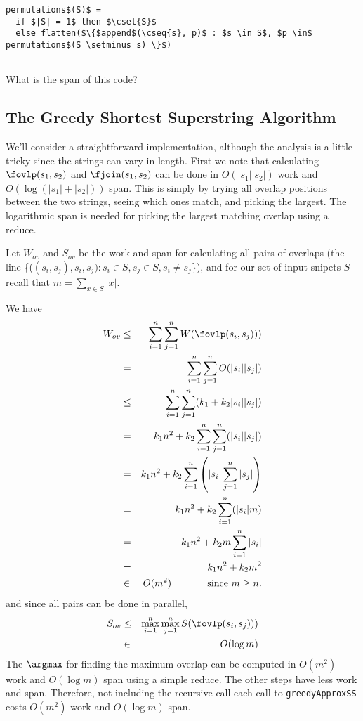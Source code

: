 \begin{lstlisting}[numbers=none]
permutations$(S)$ =
  if $|S| = 1$ then $\cset{S}$
  else flatten($\{$append$(\cseq{s}, p)$ : $s \in S$, $p \in$ permutations$(S \setminus s) \}$)
             
\end{lstlisting}

What is the span of this code?


\subsection{The Greedy Shortest Superstring Algorithm}

We'll consider a straightforward implementation, although the analysis
is a little tricky since the strings can vary in length.  First we
note that calculating $\fovlp(s_1,s_2)$ and $\fjoin(s_1,s_2)$ can be
done in $O(|s_1| |s_2|)$ work and $O(\log (|s_1|+|s_2|))$ span.  This
is simply by trying all overlap positions between the two strings,
seeing which ones match, and picking the largest.  The logarithmic
span is needed for picking the largest matching overlap using a
reduce.

Let $W_{ov}$ and $S_{ov}$ be the work and span for calculating
all pairs of overlaps (the line
\{(\fovlp\!\!$(s_i, s_j), s_i, s_j) : s_i \in S, s_j \in S, s_i \neq s_j$\}),
and for our set of input snipets $S$ recall that $m =  \sum_{x \in S} |x|$.

We have
\begin{eqnarray*}
W_{ov} & \leq & \sum_{i=1}^{n}\sum_{j=1}^{n} W(\fovlp(s_i,s_j)))\\
  & = & \sum_{i=1}^{n}\sum_{j=1}^{n} O(|s_i| |s_j|)\\
  & \leq & \sum_{i=1}^{n}\sum_{j=1}^{n} (k_1 + k_2 |s_i| |s_j|)\\
  & =    & k_1 n^2 + k_2 \sum_{i=1}^{n}\sum_{j=1}^{n} (|s_i| |s_j|)\\
  & =    & k_1 n^2 + k_2 \sum_{i=1}^{n} \left(|s_i| \sum_{j=1}^{n} |s_j|\right)\\
  & =    & k_1 n^2 + k_2 \sum_{i=1}^{n} (|s_i| m) \\
  & =    & k_1 n^2 + k_2 m \sum_{i=1}^{n} |s_i| \\
  & =    & k_1 n^2 + k_2 m^2\\
  & \in  & O(m^2)  \mbox{~~~~~~~~~~~since } m \geq n.
\end{eqnarray*}
and since all pairs can be done in parallel,
\begin{eqnarray*}
S_{ov} & \leq & \max_{i=1}^{n}\max_{j=1}^{n} S(\fovlp(s_i,s_j)))\\
    & \in  & O(\log m)
\end{eqnarray*}
The $\argmax$ for finding the maximum overlap 
can be computed in $O(m^2)$ work and $O(\log m)$
span using a simple reduce.  The other steps have less work
and span.  Therefore, not including the recursive
call each call to \texttt{greedyApproxSS} costs $O(m^2)$
work and $O(\log m)$ span.


